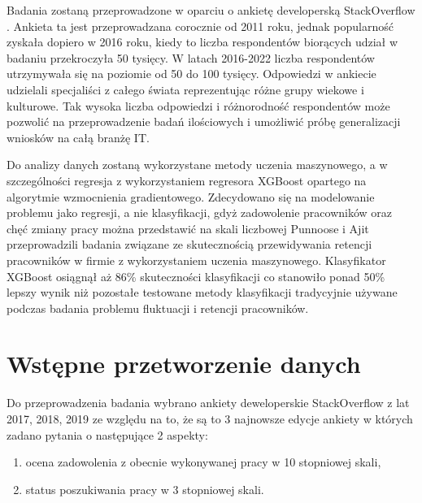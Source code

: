 Badania zostaną przeprowadzone w oparciu o ankietę developerską StackOverflow \cite{so-survey-info}.
Ankieta ta jest przeprowadzana corocznie od 2011 roku, jednak popularność zyskała dopiero w 2016 roku, kiedy to liczba respondentów biorących udział w badaniu przekroczyła 50 tysięcy.
W latach 2016-2022 liczba respondentów utrzymywała się na poziomie od 50 do 100 tysięcy.
Odpowiedzi w ankiecie udzielali specjaliści z całego świata reprezentując różne grupy wiekowe i kulturowe.
Tak wysoka liczba odpowiedzi i różnorodność respondentów może pozwolić na przeprowadzenie badań ilościowych i umożliwić próbę generalizacji wniosków na całą branżę IT.


Do analizy danych zostaną wykorzystane metody uczenia maszynowego, a w szczególności regresja z wykorzystaniem regresora XGBoost opartego na algorytmie wzmocnienia gradientowego.
Zdecydowano się na modelowanie problemu jako regresji, a nie klasyfikacji, gdyż zadowolenie pracowników oraz chęć zmiany pracy można przedstawić na skali liczbowej
Punnoose i Ajit \cite{punnoose-2016} przeprowadzili badania związane ze skutecznością przewidywania retencji pracowników w firmie z wykorzystaniem uczenia maszynowego.
Klasyfikator XGBoost osiągnął aż 86\% skuteczności klasyfikacji co stanowiło ponad 50\% lepszy wynik niż pozostałe testowane metody klasyfikacji tradycyjnie używane podczas badania problemu fluktuacji i retencji pracowników.

\section{Wstępne przetworzenie danych}\label{sec:analysis:preprocessing}
Do przeprowadzenia badania wybrano ankiety deweloperskie StackOverflow z lat 2017, 2018, 2019 ze względu na to, że są to 3 najnowsze edycje ankiety w których zadano pytania o następujące 2 aspekty:
\begin{enumerate}
    \item ocena zadowolenia z obecnie wykonywanej pracy w 10 stopniowej skali,
    \item status poszukiwania pracy w 3 stopniowej skali.
    \end{enumerate}

